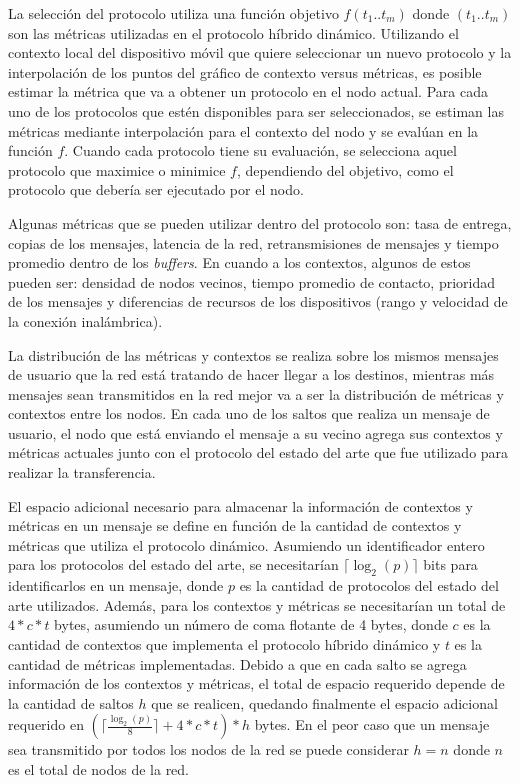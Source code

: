 La selección del protocolo utiliza una función objetivo $f(t_1..t_m)$ donde
$(t_1..t_m)$ son las métricas utilizadas en el protocolo híbrido dinámico.
Utilizando el contexto local del dispositivo móvil que quiere seleccionar un
nuevo protocolo y la interpolación de los puntos del gráfico de contexto versus
métricas, es posible estimar la métrica que va a obtener un protocolo en el nodo
actual. Para cada uno de los protocolos que estén disponibles para ser
seleccionados, se estiman las métricas mediante interpolación para el contexto
del nodo y se evalúan en la función $f$. Cuando cada protocolo tiene su
evaluación, se selecciona aquel protocolo que maximice o minimice $f$, dependiendo
del objetivo, como el protocolo que debería ser ejecutado por el nodo.

Algunas métricas que se pueden utilizar dentro del protocolo son: tasa de
entrega, copias de los mensajes, latencia de la red, retransmisiones de mensajes
y tiempo promedio dentro de los \textit{buffers}. En cuando a los contextos,
algunos de estos pueden ser: densidad de nodos vecinos, tiempo promedio de
contacto, prioridad de los mensajes y diferencias de recursos de los
dispositivos (rango y velocidad de la conexión inalámbrica).


La distribución de las métricas y contextos se realiza sobre los mismos mensajes
de usuario que la red está tratando de hacer llegar a los destinos,  mientras
más mensajes sean transmitidos en la red mejor va a ser la distribución de
métricas y contextos entre los nodos. En cada uno de los saltos que realiza un
mensaje de usuario, el nodo que está enviando el mensaje a su vecino agrega sus
contextos y métricas actuales junto con el protocolo del estado del arte que fue
utilizado para realizar la transferencia.

El espacio adicional necesario para almacenar la información de contextos y
métricas en un mensaje se define en función de la cantidad de contextos y
métricas que utiliza el protocolo dinámico. Asumiendo un identificador entero
para los protocolos del estado del arte, se necesitarían $\lceil \log_2(p)
\rceil$ bits para identificarlos en un mensaje, donde $p$ es la cantidad de
protocolos del estado del arte utilizados. Además, para los contextos y métricas
se necesitarían un total de $4*c*t$ bytes, asumiendo un número de coma flotante
de 4 bytes, donde $c$ es la cantidad de contextos que implementa el protocolo
híbrido dinámico y $t$ es la cantidad de métricas implementadas. Debido a que en
cada salto se agrega información de los contextos y métricas, el total de
espacio requerido depende de la cantidad de saltos $h$ que se realicen, quedando
finalmente el espacio adicional requerido en $(\lceil \frac{\log_2(p)}{8} \rceil
+ 4*c*t)*h$ bytes. En el peor caso que un mensaje sea transmitido por todos los
nodos de la red se puede considerar $h = n$ donde $n$ es el total de nodos de la
red.


